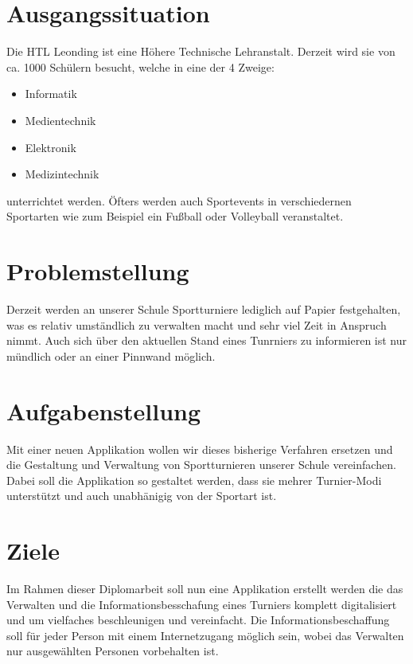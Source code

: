 \section{Ausgangssituation}
Die HTL Leonding ist eine Höhere Technische Lehranstalt. 
Derzeit wird sie von ca. 1000 Schülern besucht, welche in eine der 4 Zweige:
\begin{itemize}
\item  Informatik
\item Medientechnik
\item Elektronik
\item Medizintechnik
\end{itemize}

unterrichtet werden. Öfters werden auch Sportevents in verschiedernen Sportarten 
wie zum Beispiel ein Fußball oder Volleyball veranstaltet.

\section{Problemstellung}

 Derzeit werden an unserer Schule Sportturniere lediglich auf Papier festgehalten, 
 was es relativ umständlich zu verwalten macht und sehr viel Zeit in Anspruch nimmt. 
 Auch sich über den aktuellen Stand eines Tunrniers zu informieren ist nur mündlich oder an einer Pinnwand möglich.

\section{Aufgabenstellung}
Mit einer neuen Applikation wollen wir dieses bisherige Verfahren ersetzen und die Gestaltung 
und Verwaltung von Sportturnieren unserer Schule vereinfachen. Dabei soll die Applikation so gestaltet werden, 
dass sie mehrer Turnier-Modi unterstützt und auch unabhänigig von der Sportart ist.

\section{Ziele}
Im Rahmen dieser Diplomarbeit soll nun eine Applikation erstellt werden die das Verwalten und die 
Informationsbesschafung eines Turniers komplett digitalisiert und um vielfaches beschleunigen und vereinfacht. 
Die Informationsbeschaffung soll für jeder Person mit einem Internetzugang möglich sein, 
wobei das Verwalten nur ausgewählten Personen vorbehalten ist.